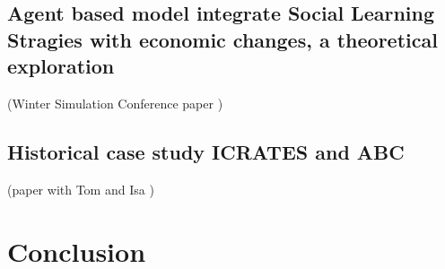 \documentclass[12pt, b5paper,twoside]{tesi_upf}
\begin{document}
\section{Agent based model integrate Social Learning Stragies with economic changes, a theoretical exploration}
(Winter Simulation Conference paper \cite{carrignon2015modelingthecoevolutionoftradeandcultureinpastsocieties})
\section{ Historical case study ICRATES and ABC} (paper with Tom and Isa \cite{carrignon2018abmtrac})
\chapter{Conclusion}
       






\backmatter
\printindex
\end{document}
